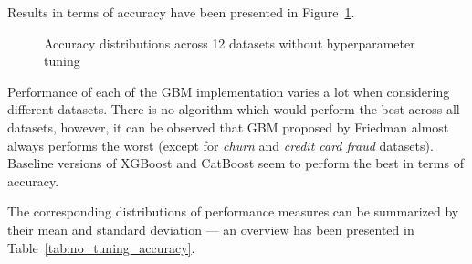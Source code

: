 \documentclass[magisterska, english]{pwr_wmat_praca_dyplomowa}
\theoremstyle{plain}
\numberwithin{theorem}{chapter}
\theoremstyle{definition}
\numberwithin{theorem}{chapter}
\begin{document}
Results in terms of accuracy have been presented in Figure~\ref{fig:no_tuning_accuracy}.

\begin{figure}[H]
	\centering
	\caption{Accuracy distributions across 12 datasets without hyperparameter tuning}
	\label{fig:no_tuning_accuracy}
\end{figure}

Performance of each of the GBM implementation varies a lot when considering different datasets. There is no algorithm which would perform the best across all datasets, however, it can be observed that GBM proposed by Friedman \cite{friedman_gbm} almost always performs the worst (except for \emph{churn} and \emph{credit card fraud} datasets). Baseline versions of XGBoost and CatBoost seem to perform the best in terms of accuracy. 

The corresponding distributions of  performance measures can be summarized by their mean and standard deviation --- an overview has been presented in Table~\ref{tab:no_tuning_accuracy}.
\end{document}

